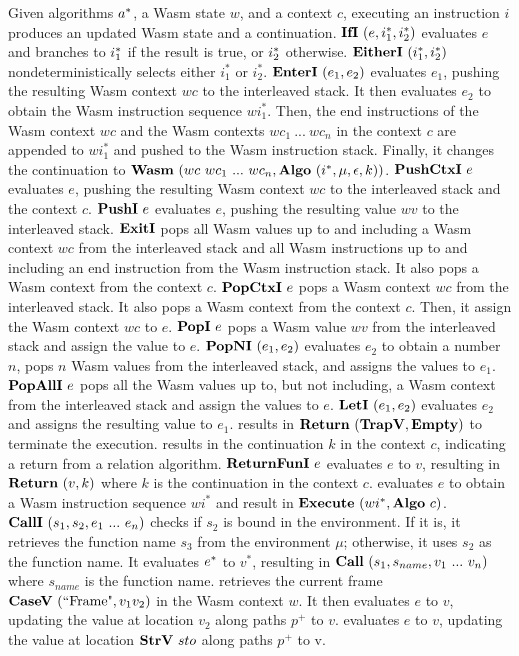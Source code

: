 Given algorithms $a^*$, a Wasm state $w$, and a context $c$, executing an
instruction $i$ produces an updated Wasm state and a continuation.
$\textbf{IfI} ~ (e, i_1^*, i_2^*)${} evaluates $e$ and branches to $i^*_1$ if the
result is true, or $i^*_2$ otherwise.
$\textbf{EitherI} ~ (i_1^*, i_2^*)${} nondeterministically selects either $i_1^*$ or
$i_2^*$.
$\textbf{EnterI} ~ (e_1, e_2)${} evaluates $e_1$, pushing the resulting Wasm context
$wc$ to the interleaved stack.
It then evaluates $e_2$ to obtain the Wasm instruction sequence $wi_1^*$.
Then, the end instructions of the Wasm context $wc$ and the Wasm contexts
$wc_1 ~ ... ~ wc_n$ in the context $c$ are appended to $wi_1^*$ and pushed to
the Wasm instruction stack.
Finally, it changes the continuation to
$\textbf{Wasm} ~ (wc ~ wc_1 ~ ... ~ wc_n, \textbf{Algo} ~ (i^*, \mu, \epsilon, k))${}.
$\textbf{PushCtxI} ~ e${} evaluates $e$, pushing the resulting Wasm context $wc$ to the
interleaved stack and the context $c$.
$\textbf{PushI} ~ e${} evaluates $e$, pushing the resulting value $wv$ to the
interleaved stack.
$\textbf{ExitI}${} pops all Wasm values up to and including a Wasm context $wc$ from
the interleaved stack and all Wasm instructions up to and including an end
instruction from the Wasm instruction stack.
It also pops a Wasm context from the context $c$.
$\textbf{PopCtxI} ~ e${} pops a Wasm context $wc$ from the interleaved stack.
It also pops a Wasm context from the context $c$.
Then, it assign the Wasm context $wc$ to $e$.
$\textbf{PopI} ~ e${} pops a Wasm value $wv$ from the interleaved stack and assign the
value to $e$.
$\textbf{PopNI} ~ (e_1, e_2)${} evaluates $e_2$ to obtain a number $n$, pops $n$ Wasm
values from the interleaved stack, and assigns the values to $e_1$.
$\textbf{PopAllI} ~ e${} pops all the Wasm values up to, but not including, a
Wasm context from the interleaved stack and assign the values to $e$.
$\textbf{LetI} ~ (e_1, e_2)${} evaluates $e_2$ and assigns the resulting value to
$e_1$.
\trapi{} results in $\textbf{Return} ~ (\textbf{TrapV}{}, \textbf{Empty}{})$ to terminate the execution.
\returnreli{} results in the continuation $k$ in the context $c$, indicating a
return from a relation algorithm.
$\textbf{ReturnFunI} ~ e${} evaluates $e$ to $v$, resulting in $\textbf{Return} ~ (v, k)${} where
$k$ is the continuation in the context $c$.
\executei{} evaluates $e$ to obtain a Wasm instruction sequence $wi^*$ and
result in $\textbf{Execute} ~ (wi^*, \textbf{Algo} ~ c)${}.
$\textbf{CallI} ~ (s_1, s_2, e_1 ~ ... ~ e_n)${} checks if $s_2$ is bound in the
environment.
If it is, it retrieves the function name $s_3$ from the environment $\mu$;
otherwise, it uses $s_2$ as the function name.
It evaluates $e^*$ to $v^*$, resulting in $\textbf{Call} ~ (s_1, s_{name}, v_1 ~ ...
~ v_n)${} where $s_{name}$ is the function name.
\replaceframei{} retrieves the current frame $\textbf{CaseV} ~ (\text{``Frame"}, v_1
v_2)${} in the Wasm context $w$.
It then evaluates $e$ to $v$, updating the value at location $v_2$ along paths
$p^+$ to $v$.
\replacestorei{} evaluates $e$ to $v$, updating the value at location $\textbf{StrV} ~
sto$ along paths $p^+$ to v.




